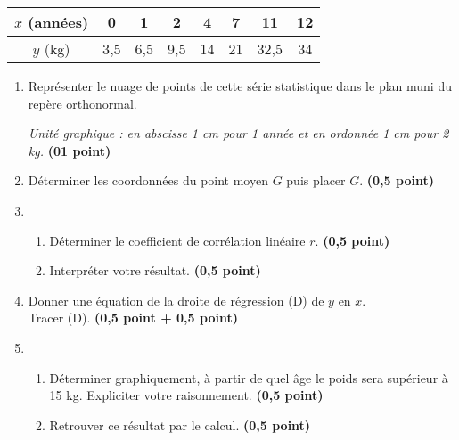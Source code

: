 \documentclass[12pt,a4paper]{article}
\begin{document}
\begin{center}
\begin{tabular}{|c|c|c|c|c|c|c|c|}
\hline
\( x \) (années) & 0 & 1 & 2 & 4 & 7 & 11 & 12 \\
\hline
\( y \) (kg) & 3{,}5 & 6{,}5 & 9{,}5 & 14 & 21 & 32{,}5 & 34 \\
\hline
\end{tabular}
\end{center}

\vspace{0.5cm}

\begin{enumerate}
    \item Représenter le nuage de points de cette série statistique dans le plan muni du repère orthonormal.

    \hspace{0.5cm} \textit{Unité graphique : en abscisse 1 cm pour 1 année et en ordonnée 1 cm pour 2 kg.} \hfill \textbf{(01 point)}

    \item Déterminer les coordonnées du point moyen \( G \) puis placer \( G \). \hfill \textbf{(0,5 point)}

    \item
    \begin{enumerate}
        \item Déterminer le coefficient de corrélation linéaire \( r \). \hfill \textbf{(0,5 point)}
        \item Interpréter votre résultat. \hfill \textbf{(0,5 point)}
    \end{enumerate}

    \item Donner une équation de la droite de régression (D) de \( y \) en \( x \).\\
    \hspace*{0.5cm} Tracer (D). \hfill \textbf{(0,5 point + 0,5 point)}

    \item
    \begin{enumerate}
        \item Déterminer graphiquement, à partir de quel âge le poids sera supérieur à 15 kg. Expliciter votre raisonnement. \hfill \textbf{(0,5 point)}
        \item Retrouver ce résultat par le calcul. \hfill \textbf{(0,5 point)}
    \end{enumerate}
\end{enumerate}
\end{document}
